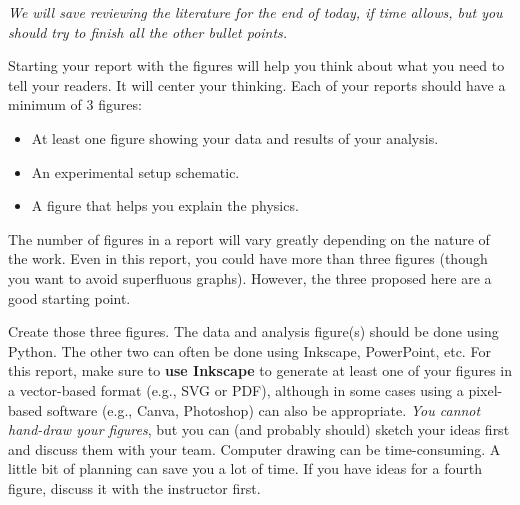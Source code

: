 \documentclass[11pt]{article}
\begin{document}

{\it We will save reviewing the literature for the end of today, if time allows, but you should try to finish all the other bullet points.}

\vspace{6mm}


\vspace{3mm}

Starting your report with the figures will help you think about what you need to tell your readers. It will center your thinking. Each of your reports should have a minimum of 3 figures:
\begin{itemize}
 \item At least one figure showing your data and results of your analysis.
 \item An experimental setup schematic.
 \item A figure that helps you explain the physics.
\end{itemize}

The number of figures in a report will vary greatly depending on the nature of the work. Even in this report, you could have more than three figures (though you want to avoid superfluous graphs). However, the three proposed here are a good starting point.

Create those three figures. The data and analysis figure(s) should be done using Python. The other two can often be done using Inkscape, PowerPoint, etc. For this report, make sure to \textbf{use Inkscape} to generate at least one of your figures in a vector-based format (e.g., SVG or PDF), although in some cases using a pixel-based software (e.g., Canva, Photoshop) can also be appropriate. \textit{You cannot hand-draw your figures}, but you can (and probably should) sketch your ideas first and discuss them with your team. Computer drawing can be time-consuming. A little bit of planning can save you a lot of time. If you have ideas for a fourth figure, discuss it with the instructor first.

\vspace{3mm}
\end{document}
